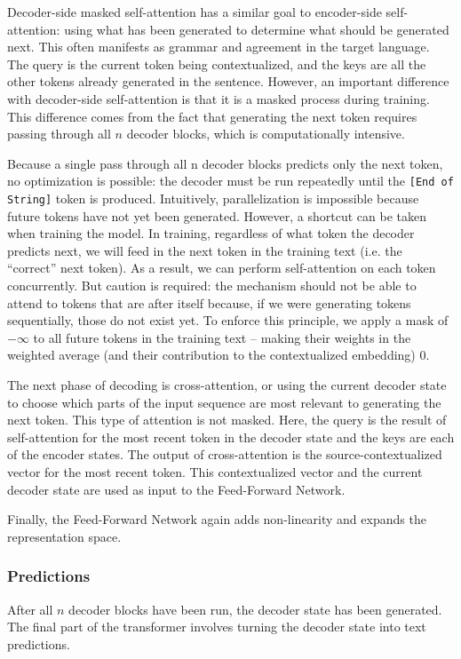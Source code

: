 Decoder-side masked self-attention has a similar goal to encoder-side self-attention: using what has been generated to determine what should be generated next. This often manifests as grammar and agreement in the target language. The query is the current token being contextualized, and the keys are all the other tokens already generated in the sentence. However, an important difference with decoder-side self-attention is that it is a masked process during training. This difference comes from the fact that generating the next token requires passing through all $n$ decoder blocks, which is computationally intensive.

Because a single pass through all n decoder blocks predicts only the next token, no optimization is possible: the decoder must be run repeatedly until the \texttt{[End of String]} token is produced. Intuitively, parallelization is impossible because future tokens have not yet been generated. However, a shortcut can be taken when training the model. In training, regardless of what token the decoder predicts next, we will feed in the next token in the training text (i.e. the “correct” next token). As a result, we can perform self-attention on each token concurrently. But caution is required: the mechanism should not be able to attend to tokens that are after itself because, if we were generating tokens sequentially, those do not exist yet. To enforce this principle, we apply a mask of $-\infty$ to all future tokens in the training text – making their weights in the weighted average (and their contribution to the contextualized embedding) $0$.

The next phase of decoding is cross-attention, or using the current decoder state to choose which parts of the input sequence are most relevant to generating the next token. This type of attention is not masked. Here, the query is the result of self-attention for the most recent token in the decoder state and the keys are each of the encoder states. The output of cross-attention is the source-contextualized vector for the most recent token. This contextualized vector and the current decoder state are used as input to the Feed-Forward Network.

Finally, the Feed-Forward Network again adds non-linearity and expands the representation space.

\subsubsection{Predictions}
After all $n$ decoder blocks have been run, the decoder state has been generated. The final part of the transformer involves turning the decoder state into text predictions. 

